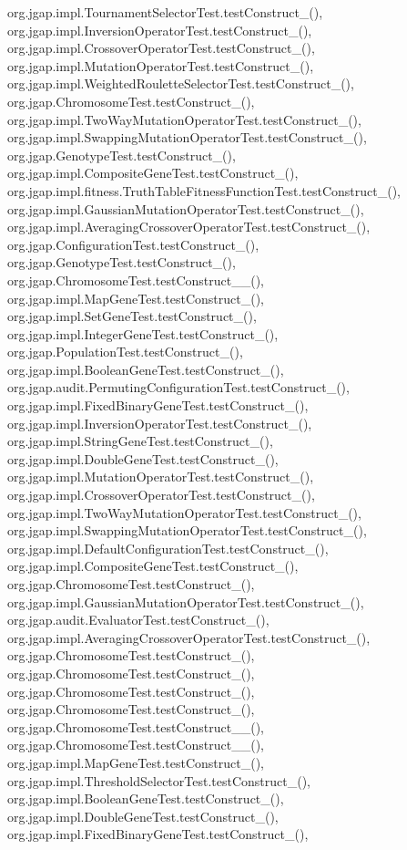 org.\-jgap.\-impl.\-Tournament\-Selector\-Test.\-test\-Construct\-\_(), org.\-jgap.\-impl.\-Inversion\-Operator\-Test.\-test\-Construct\-\_(), org.\-jgap.\-impl.\-Crossover\-Operator\-Test.\-test\-Construct\-\_(), org.\-jgap.\-impl.\-Mutation\-Operator\-Test.\-test\-Construct\-\_(), org.\-jgap.\-impl.\-Weighted\-Roulette\-Selector\-Test.\-test\-Construct\-\_(), org.\-jgap.\-Chromosome\-Test.\-test\-Construct\-\_(), org.\-jgap.\-impl.\-Two\-Way\-Mutation\-Operator\-Test.\-test\-Construct\-\_(), org.\-jgap.\-impl.\-Swapping\-Mutation\-Operator\-Test.\-test\-Construct\-\_(), org.\-jgap.\-Genotype\-Test.\-test\-Construct\-\_(), org.\-jgap.\-impl.\-Composite\-Gene\-Test.\-test\-Construct\-\_(), org.\-jgap.\-impl.\-fitness.\-Truth\-Table\-Fitness\-Function\-Test.\-test\-Construct\-\_(), org.\-jgap.\-impl.\-Gaussian\-Mutation\-Operator\-Test.\-test\-Construct\-\_(), org.\-jgap.\-impl.\-Averaging\-Crossover\-Operator\-Test.\-test\-Construct\-\_(), org.\-jgap.\-Configuration\-Test.\-test\-Construct\-\_(), org.\-jgap.\-Genotype\-Test.\-test\-Construct\-\_(), org.\-jgap.\-Chromosome\-Test.\-test\-Construct\-\_\-\_(), org.\-jgap.\-impl.\-Map\-Gene\-Test.\-test\-Construct\-\_(), org.\-jgap.\-impl.\-Set\-Gene\-Test.\-test\-Construct\-\_(), org.\-jgap.\-impl.\-Integer\-Gene\-Test.\-test\-Construct\-\_(), org.\-jgap.\-Population\-Test.\-test\-Construct\-\_(), org.\-jgap.\-impl.\-Boolean\-Gene\-Test.\-test\-Construct\-\_(), org.\-jgap.\-audit.\-Permuting\-Configuration\-Test.\-test\-Construct\-\_(), org.\-jgap.\-impl.\-Fixed\-Binary\-Gene\-Test.\-test\-Construct\-\_(), org.\-jgap.\-impl.\-Inversion\-Operator\-Test.\-test\-Construct\-\_(), org.\-jgap.\-impl.\-String\-Gene\-Test.\-test\-Construct\-\_(), org.\-jgap.\-impl.\-Double\-Gene\-Test.\-test\-Construct\-\_(), org.\-jgap.\-impl.\-Mutation\-Operator\-Test.\-test\-Construct\-\_(), org.\-jgap.\-impl.\-Crossover\-Operator\-Test.\-test\-Construct\-\_(), org.\-jgap.\-impl.\-Two\-Way\-Mutation\-Operator\-Test.\-test\-Construct\-\_(), org.\-jgap.\-impl.\-Swapping\-Mutation\-Operator\-Test.\-test\-Construct\-\_(), org.\-jgap.\-impl.\-Default\-Configuration\-Test.\-test\-Construct\-\_(), org.\-jgap.\-impl.\-Composite\-Gene\-Test.\-test\-Construct\-\_(), org.\-jgap.\-Chromosome\-Test.\-test\-Construct\-\_(), org.\-jgap.\-impl.\-Gaussian\-Mutation\-Operator\-Test.\-test\-Construct\-\_(), org.\-jgap.\-audit.\-Evaluator\-Test.\-test\-Construct\-\_(), org.\-jgap.\-impl.\-Averaging\-Crossover\-Operator\-Test.\-test\-Construct\-\_(), org.\-jgap.\-Chromosome\-Test.\-test\-Construct\-\_(), org.\-jgap.\-Chromosome\-Test.\-test\-Construct\-\_(), org.\-jgap.\-Chromosome\-Test.\-test\-Construct\-\_(), org.\-jgap.\-Chromosome\-Test.\-test\-Construct\-\_(), org.\-jgap.\-Chromosome\-Test.\-test\-Construct\-\_\-\_(), org.\-jgap.\-Chromosome\-Test.\-test\-Construct\-\_\-\_(), org.\-jgap.\-impl.\-Map\-Gene\-Test.\-test\-Construct\-\_(), org.\-jgap.\-impl.\-Threshold\-Selector\-Test.\-test\-Construct\-\_(), org.\-jgap.\-impl.\-Boolean\-Gene\-Test.\-test\-Construct\-\_(), org.\-jgap.\-impl.\-Double\-Gene\-Test.\-test\-Construct\-\_(), org.\-jgap.\-impl.\-Fixed\-Binary\-Gene\-Test.\-test\-Construct\-\_(), 